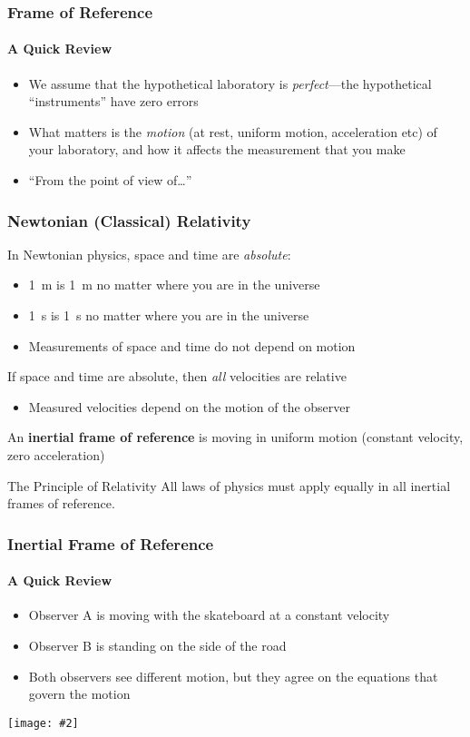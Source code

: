 \documentclass[12pt,compress,aspectratio=169]{beamer}
\newcommand{\pic}[2]{\texttt{[image: \#2]}}
\begin{document}
\begin{frame}
  \frametitle{Frame of Reference}
  \framesubtitle{A Quick Review}
  \begin{itemize}
  \item We assume that the hypothetical laboratory is \emph{perfect}---the
    hypothetical ``instruments'' have zero errors
  \item What matters is the \emph{motion} (at rest, uniform motion, acceleration
    etc) of your laboratory, and how it affects the measurement that you make
  \item ``From the point of view of\ldots''
  \end{itemize}
\end{frame}


\begin{frame}
  \frametitle{Newtonian (Classical) Relativity}

  In Newtonian physics, space and time are \emph{absolute}:
  \begin{itemize}
  \item \SI{1}{m} is \SI{1}{m} no matter where you are in the universe
  \item \SI{1}{s} is \SI{1}{s} no matter where you are in the universe
  \item Measurements of space and time do not depend on motion
  \end{itemize}
  If space and time are absolute, then \emph{all} velocities are relative
  \begin{itemize}
  \item Measured velocities depend on the motion of the observer
  \end{itemize}
  An \textbf{inertial frame of reference} is moving in uniform motion (constant
  velocity, zero acceleration)


  \vspace{.2in}
  \begin{block}{The Principle of Relativity}
    All laws of physics must apply equally in all inertial frames of reference.
  \end{block}
\end{frame}


\begin{frame}
  \frametitle{Inertial Frame of Reference}
  \framesubtitle{A Quick Review}
  \begin{itemize}
  \item Observer A is moving with the skateboard at a constant velocity
  \item Observer B is standing on the side of the road
  \item Both observers see different motion, but they agree on the equations
    that govern the motion
  \end{itemize}
  \begin{center}
    \pic{.75}{graphics/57.jpg}
  \end{center}
\end{frame}
\end{document}
